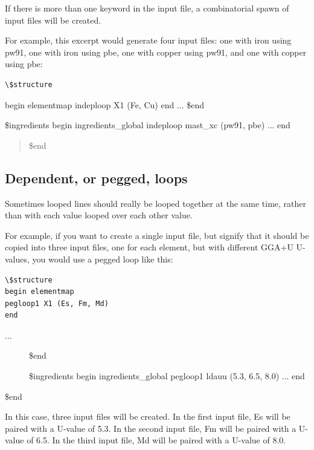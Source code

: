 \documentclass[letterpaper,10pt,english]{sphinxmanual}
\begin{document}
If there is more than one  keyword in the input file, a combinatorial spawn of input files will be created.

For example, this excerpt would generate four input files: one with iron using pw91, one with iron using pbe, one with copper using pw91, and one with copper using pbe:

\begin{Verbatim}[commandchars=\\\{\}]
\$structure
\end{Verbatim}

begin elementmap
indeploop X1 (Fe, Cu)
end
...
\$end

\$ingredients
begin ingredients\_global
indeploop mast\_xc (pw91, pbe)
...
end
\begin{quote}

\$end
\end{quote}


\subsection{Dependent, or pegged, loops}
\label{3_0_inputfile:dependent-or-pegged-loops}
Sometimes looped lines should really be looped together at the same time, rather than with each value looped over each other value.

For example, if you want to create a single input file, but signify that it should be copied into three input files, one for each element, but with different GGA+U U-values, you would use a pegged loop like this:

\begin{Verbatim}[commandchars=\\\{\}]
\$structure
begin elementmap
pegloop1 X1 (Es, Fm, Md)
end
\end{Verbatim}
\begin{description}
\item[{...}] \leavevmode
\$end

\$ingredients
begin ingredients\_global
pegloop1 ldauu (5.3, 6.5, 8.0)
...
end

\end{description}

\$end

In this case, three input files will be created. In the first input file, Es will be paired with a U-value of 5.3. In the second input file, Fm will be paired with a U-value of 6.5. In the third input file, Md will be paired with a U-value of 8.0.
\end{document}
